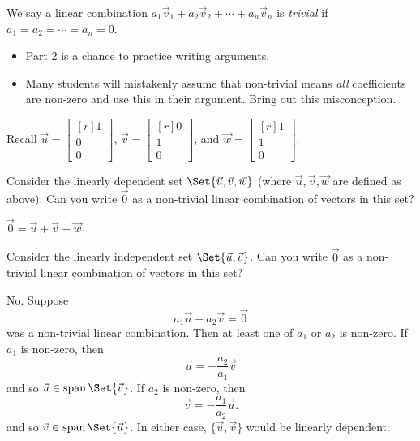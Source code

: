 \documentclass{problemset}
\DeclareMathOperator{\Span}{span}
\newcommand{\mat}[1]{\begin{bmatrix*}[r]#1\end{bmatrix*}}
\begin{document}
	\begin{definition}
	We say a linear combination
	$a_1\vec v_1+a_2\vec v_2+\cdots +a_n\vec v_n$
	is \emph{trivial} if $a_1=a_2=\cdots=a_n=0$.
	\end{definition}

	\question
	\begin{annotation}
		\begin{goals}
		\end{goals}

		\begin{notes}
			\begin{itemize}
				\item Part 2 is a chance to practice writing arguments.
				\item Many students will mistakenly assume that non-trivial means
					\emph{all} coefficients are non-zero and use this in
					their argument. Bring out this misconception.
			\end{itemize}
		\end{notes}
	\end{annotation}
		Recall $\vec u=\mat{1\\0\\0}$, $\vec v=\mat{0\\1\\0}$, and $\vec w=\mat{1\\1\\0}$.
	\begin{parts}
		\item Consider the linearly dependent
			set $\Set{\vec u,\vec v,\vec w}$ (where $\vec u,\vec v,\vec w$ are
			defined as above). Can you write $\vec 0$ as a non-trivial linear
			combination of vectors in this set?
			\begin{solution}[inline]
				$\vec 0 = \vec u + \vec v - \vec w$.
			\end{solution}
		\item Consider the linearly independent set $\Set{\vec u,\vec v}$.
			Can you write $\vec 0$ as a non-trivial linear combination of
			vectors in this set?
			\begin{solution}
				No. Suppose
				\[
					a_1 \vec u + a_2 \vec v = \vec 0
				\]
				was a non-trivial linear combination. Then at least one of $a_1$ or $a_2$
				is non-zero. If $a_1$ is non-zero, then
				\[
					\vec u = -\frac{a_2}{a_1}\vec v
				\]
				and so $\vec u\in\Span\Set{\vec v}$.
				If $a_2$ is non-zero, then
				\[
					\vec v=-\frac{a_1}{a_2}\vec u.
				\]
				and so $\vec v\in\Span\Set{\vec u}$.
				In either case, $\{\vec u,\vec v\}$ would be linearly dependent.
			\end{solution}
	\end{parts}
\end{document}
